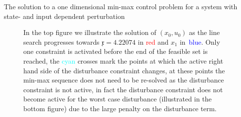 \begin{example}{The solution to a one dimensional min-max control problem for a system with state- and input dependent perturbation}
\begin{figure}
\caption[The solution for Example~\ref{example:state:input:dependent:min:max}]{In the top figure we illustrate the solution of $(x_0,u_0)$ as the line search progresses towards $\mathfrak{x}=4.22074$ in \textcolor{red}{red} and $x_1$ in~\textcolor{blue}{blue}. Only one constraint is activated before the end of the feasible set is reached, the \textcolor{cyan}{cyan} crosses mark the points at which the active right hand side of the disturbance constraint changes, at these points the min-max sequence does not need to be re-solved as the disturbance constraint is not active, in fact the disturbance constraint does not become active for the worst case disturbance (illustrated in the bottom figure) due to the large penalty on the disturbance term.}
\label{fig:example:min:max:state:dep:1}
\end{figure}


\end{example}
